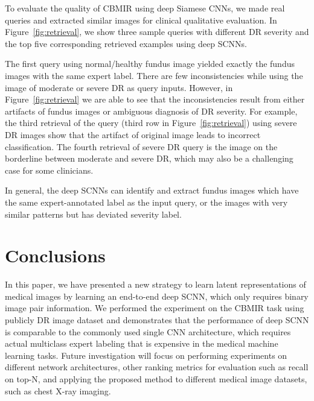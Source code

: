 \documentclass{article}
\begin{document}
To evaluate the quality of CBMIR using deep Siamese CNNs, we made real queries and extracted similar images for clinical qualitative evaluation. In Figure~\ref{fig:retrieval}, we show three sample queries with different DR severity and the top five corresponding retrieved examples using deep SCNNs.  

The first query using normal/healthy fundus image yielded exactly the fundus images with the same expert label. 
There are few inconsistencies while using the image of moderate or severe DR as query inputs. 
However, in Figure~\ref{fig:retrieval} we are able to see that the inconsistencies result from either artifacts of fundus images or ambiguous diagnosis of DR severity.
For example, the third retrieval of the query (third row in Figure~\ref{fig:retrieval}) using severe DR images show that the artifact of original image leads to incorrect classification. The fourth retrieval of severe DR query is the image on the borderline between moderate and severe DR, which may also be a challenging case for some clinicians.

In general, the deep SCNNs can identify and extract fundus images which have the same expert-annotated label as the input query, or the images with very similar patterns but has deviated severity label.

\section{Conclusions}
In this paper, we have presented a new strategy to learn latent representations of medical images by learning an end-to-end deep SCNN, which only requires binary image pair information. 
We performed the experiment on the CBMIR task using publicly DR image dataset and demonstrates that the performance of deep SCNN is comparable to the commonly used single CNN architecture, which requires actual multiclass expert labeling that is expensive in the medical machine learning tasks.  
Future investigation will focus on performing experiments on different network architectures, other ranking metrics for evaluation such as recall on top-N, and applying the proposed method to different medical image datasets, such as chest X-ray imaging.



\end{document}

